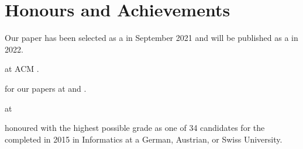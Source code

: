 \section{Honours and Achievements}
\begin{cvitemize}
    \item Our  paper has been selected as a  in September 2021 and will be published as a  in 2022.
    \item {} at ACM .
    \item {} for our papers at  and .
    \item {} at
        \begin{inlineItemize}
        \item {}
        \item {}
        \item {}
        \end{inlineItemize}
    \item {} honoured with the highest possible grade \newline
           as one of 34 candidates for the  completed in 2015 in Informatics at a German, Austrian, or Swiss University.
\end{cvitemize}